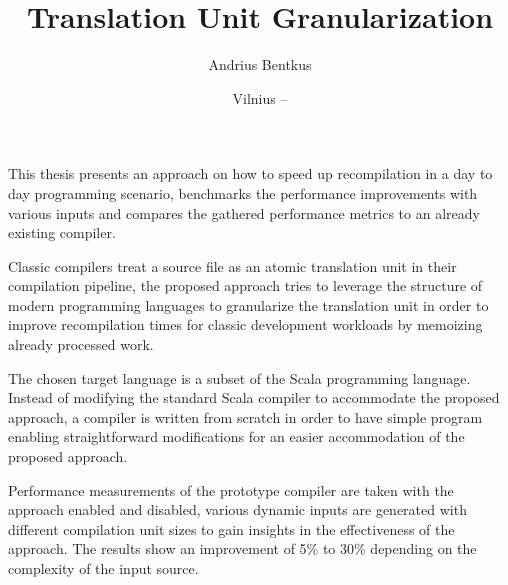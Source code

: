 \documentclass{VUMIFPSbakalaurinis}
\institute{Informatikos institutas}  %
\title{Translation Unit Granularization}
\author{Andrius Bentkus}
\date{Vilnius – \the\year}
\begin{document}
\maketitle


\addtocounter{page}{1}

This thesis presents an approach on how to speed up recompilation in a day to day programming scenario, benchmarks the performance improvements with various inputs and compares the gathered performance metrics to an already existing compiler.

Classic compilers treat a source file as an atomic translation unit in their compilation pipeline, the proposed approach tries to leverage the structure of modern programming languages to granularize the translation unit in order to improve recompilation times for classic development workloads by memoizing already processed work.

The chosen target language is a subset of the Scala programming language.
Instead of modifying the standard Scala compiler to accommodate the proposed approach, a compiler is written from scratch in order to have simple program enabling straightforward modifications for an easier accommodation of the proposed approach.

Performance measurements of the prototype compiler are taken with the approach enabled and disabled, various dynamic inputs are generated with different compilation unit sizes to gain insights in the effectiveness of the approach. The results show an improvement of 5\% to 30\% depending on the complexity of the input source.





\tableofcontents

\end{document}
